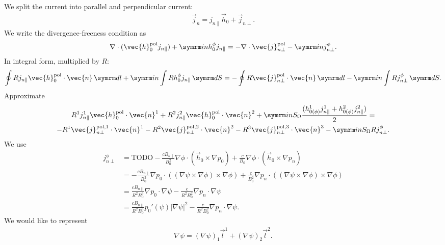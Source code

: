 We split the current into parallel and perpendicular current:
\begin{gather}
  \vec{j}_{n} = j_{n \parallel} \vec{h}_{0} + \vec{j}_{n \perp}.
\end{gather}
We write the divergence-freeness condition as
\begin{gather}
  \nabla \cdot (\vec{h}_{0}^{\pol} j_{n \parallel}) + \im n h_{0}^{\phi} j_{n \parallel} = -\nabla \cdot \vec{j}_{n \perp}^{\pol} - \im n j_{n \perp}^{\phi}.
\end{gather}
In integral form, multiplied by $R$:
\begin{gather}
  \oint R j_{n \parallel} \vec{h}_{0}^{\pol} \cdot \vec{n} \, \diff l + \im n \int R h_{0}^{\phi} j_{n \parallel} \, \diff S = -\oint R \vec{j}_{n \perp}^{\pol} \cdot \vec{n} \, \diff l - \im n \int R j_{n \perp}^{\phi} \, \diff S.
\end{gather}
Approximate
\begin{gather}
  R^{1} j_{n \parallel}^{1} \vec{h}_{0}^{\pol} \cdot \vec{n}^{1} + R^{2} j_{n \parallel}^{2} \vec{h}_{0}^{\pol} \cdot \vec{n}^{2} + \im n S_{\Omega} \frac{(h_{0 (\phi)}^{1} j_{n \parallel}^{1} + h_{0 (\phi)}^{2} j_{n \parallel}^{2})}{2} = \nonumber \\
  -R^{1} \vec{j}_{n \perp}^{\pol, 1} \cdot \vec{n}^{1} - R^{2} \vec{j}_{n \perp}^{\pol, 2} \cdot \vec{n}^{2} - R^{3} \vec{j}_{n \perp}^{\pol, 3} \cdot \vec{n}^{3} - \im n S_{\Omega} R j_{n \perp}^{\phi}.
\end{gather}
We use
\begin{align}
  j_{n \perp}^{\phi} &= \text{TODO} - \frac{c B_{n \parallel}}{B_{0}^{2}} \nabla \phi \cdot (\vec{h}_{0} \times \nabla p_{0}) + \frac{c}{B_{0}} \nabla \phi \cdot (\vec{h}_{0} \times \nabla p_{n}) \\
  &= -\frac{c B_{n \parallel}}{B_{0}^{3}} \nabla p_{0} \cdot ((\nabla \psi \times \nabla \phi) \times \nabla \phi) + \frac{c}{B_{0}^{2}} \nabla p_{n} \cdot ((\nabla \psi \times \nabla \phi) \times \nabla \phi)\\
  &= \frac{c B_{n \parallel}}{R^{2} B_{0}^{3}} \nabla p_{0} \cdot \nabla \psi - \frac{c}{R^{2} B_{0}^{2}} \nabla p_{n}\cdot \nabla \psi \\
  &= \frac{c B_{n \parallel}}{R^{2} B_{0}^{3}} p_{0}'(\psi) \lvert \nabla \psi \rvert^{2} - \frac{c}{R^{2} B_{0}^{2}} \nabla p_{n} \cdot \nabla \psi.
\end{align}
We would like to represent
\begin{gather}
  \nabla \psi = (\nabla \psi)_{1} \vec{l}^{1} + (\nabla \psi)_{2} \vec{l}^{2}.
\end{gather}
